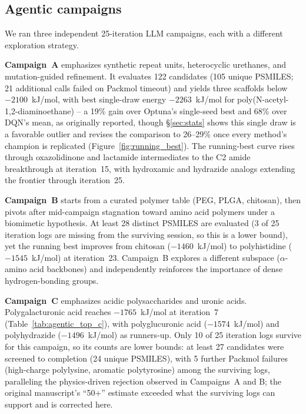 \documentclass[twocolumn]{fairmeta}
\begin{document}
\subsection{Agentic campaigns}

We ran three independent 25-iteration LLM campaigns, each with a different exploration strategy.

\textbf{Campaign~A} emphasizes synthetic repeat units, heterocyclic urethanes, and mutation-guided refinement.
It evaluates 122 candidates (105 unique PSMILES; 21 additional calls failed on Packmol timeout) and yields three scaffolds below $-2100$~kJ/mol, with best single-draw energy $-2263$~kJ/mol for poly(N-acetyl-1,2-diaminoethane) -- a 19\% gain over Optuna's single-seed best and 68\% over DQN's mean, as originally reported, though \S\ref{sec:stats} shows this single draw is a favorable outlier and revises the comparison to 26--29\% once every method's champion is replicated (Figure~\ref{fig:running_best}).
The running-best curve rises through oxazolidinone and lactamide intermediates to the C2 amide breakthrough at iteration~15, with hydroxamic and hydrazide analogs extending the frontier through iteration~25.

\textbf{Campaign~B} starts from a curated polymer table (PEG, PLGA, chitosan), then pivots after mid-campaign stagnation toward amino acid polymers under a biomimetic hypothesis.
At least 28 distinct PSMILES are evaluated (3 of 25 iteration logs are missing from the surviving session, so this is a lower bound), yet the running best improves from chitosan ($-1460$~kJ/mol) to polyhistidine ($-1545$~kJ/mol) at iteration~23.
Campaign~B explores a different subspace ($\alpha$-amino acid backbones) and independently reinforces the importance of dense hydrogen-bonding groups.

\textbf{Campaign~C} emphasizes acidic polysaccharides and uronic acids.
Polygalacturonic acid reaches $-1765$~kJ/mol at iteration~7 (Table~\ref{tab:agentic_top_c}), with polyglucuronic acid ($-1574$~kJ/mol) and polyhydrazide ($-1496$~kJ/mol) as runners-up.
Only 10 of 25 iteration logs survive for this campaign, so its counts are lower bounds: at least 27 candidates were screened to completion (24 unique PSMILES), with 5 further Packmol failures (high-charge polylysine, aromatic polytyrosine) among the surviving logs, paralleling the physics-driven rejection observed in Campaigns~A and B; the original manuscript's ``50+'' estimate exceeded what the surviving logs can support and is corrected here.
\end{document}
